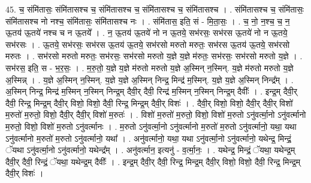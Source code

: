 \documentclass[17pt]{extarticle}
\begin{document}
45. च॒ संमि॑तासः॒ संमि॑तासश्च च॒ संमि॑तासश्च च॒ संमि॑तासश्च च॒ संमि॑तासश्च । . संमि॑तासश्च च॒ संमि॑तासः॒ संमि॑तासश्च नो नश्च॒ संमि॑तासः॒ संमि॑तासश्च नः । . संमि॑तास॒ इति॒ सं - मि॒ता॒सः॒ । . च॒ नो॒ न॒श्च॒ च॒ न॒ ऊ॒तय॑ ऊ॒तये॑ नश्च च न ऊ॒तये᳚ । . न॒ ऊ॒तय॑ ऊ॒तये॑ नो न ऊ॒तये॒ सभ॑रसः॒ सभ॑रस ऊ॒तये॑ नो न ऊ॒तये॒ सभ॑रसः । . ऊ॒तये॒ सभ॑रसः॒ सभ॑रस ऊ॒तय॑ ऊ॒तये॒ सभ॑रसो मरुतो मरुतः॒ सभ॑रस ऊ॒तय॑ ऊ॒तये॒ सभ॑रसो मरुतः । . सभ॑रसो मरुतो मरुतः॒ सभ॑रसः॒ सभ॑रसो मरुतो य॒ज्ञे य॒ज्ञे म॑रुतः॒ सभ॑रसः॒ सभ॑रसो मरुतो य॒ज्ञे । . सभ॑रस॒ इति॒ स - भ॒र॒सः॒ । . म॒रु॒तो॒ य॒ज्ञे य॒ज्ञे म॑रुतो मरुतो य॒ज्ञे अ॒स्मिन् न॒स्मिन्. य॒ज्ञे म॑रुतो मरुतो य॒ज्ञे अ॒स्मिन्न् । . य॒ज्ञे अ॒स्मिन् न॒स्मिन्. य॒ज्ञे य॒ज्ञे अ॒स्मिन् निन्द्र॒ मिन्द्र॑ म॒स्मिन्. य॒ज्ञे य॒ज्ञे अ॒स्मिन् निन्द्र᳚म् । . अ॒स्मिन् निन्द्र॒ मिन्द्र॑ म॒स्मिन् न॒स्मिन् निन्द्र॒म् दैवी॒र् दैवी॒ रिन्द्र॑ म॒स्मिन् न॒स्मिन् निन्द्र॒म् दैवीः᳚ । . इन्द्र॒म् दैवी॒र् दैवी॒ रिन्द्र॒ मिन्द्र॒म् दैवी॒र् विशो॒ विशो॒ दैवी॒ रिन्द्र॒ मिन्द्र॒म् दैवी॒र् विशः॑ । . दैवी॒र् विशो॒ विशो॒ दैवी॒र् दैवी॒र् विशो॑ म॒रुतो॑ म॒रुतो॒ विशो॒ दैवी॒र् दैवी॒र् विशो॑ म॒रुतः॑ । . विशो॑ म॒रुतो॑ म॒रुतो॒ विशो॒ विशो॑ म॒रुतो ऽनु॑वर्त्मा॒नो ऽनु॑वर्त्मानो म॒रुतो॒ विशो॒ विशो॑ म॒रुतो ऽनु॑वर्त्मानः । . म॒रुतो ऽनु॑वर्त्मा॒नो ऽनु॑वर्त्मानो म॒रुतो॑ म॒रुतो ऽनु॑वर्त्मानो॒ यथा॒ यथा ऽनु॑वर्त्मानो म॒रुतो॑ म॒रुतो ऽनु॑वर्त्मानो॒ यथा᳚ । . अनु॑वर्त्मानो॒ यथा॒ यथा ऽनु॑वर्त्मा॒नो ऽनु॑वर्त्मानो॒ यथेन्द्र॒ मिन्द्रं॒ ॅयथा ऽनु॑वर्त्मा॒नो ऽनु॑वर्त्मानो॒ यथेन्द्र᳚म् । . अनु॑वर्त्मान॒ इत्यनु॑ - व॒र्त्मा॒नः॒ । . यथेन्द्र॒ मिन्द्रं॒ ॅयथा॒ यथेन्द्र॒म् दैवी॒र् दैवी॒ रिन्द्रं॒ ॅयथा॒ यथेन्द्र॒म् दैवीः᳚ । . इन्द्र॒म् दैवी॒र् दैवी॒ रिन्द्र॒ मिन्द्र॒म् दैवी॒र् विशो॒ विशो॒ दैवी॒ रिन्द्र॒ मिन्द्र॒म् दैवी॒र् विशः॑ । \newline
\end{document}

